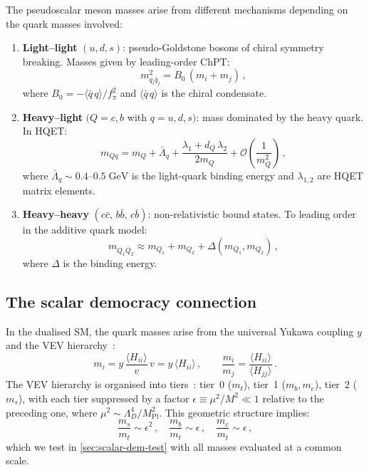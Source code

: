 \documentclass[11pt,a4paper]{article}
\newcommand{\qqbar}{\langle \bar{q}\,q \rangle}
\newcommand{\fpi}{f_\pi}
\newcommand{\Lbar}{\bar{\Lambda}}
\newcommand{\Ord}{\mathcal{O}}
\theoremstyle{plain}
\begin{document}
The pseudoscalar meson masses arise from different mechanisms depending
on the quark masses involved:
\begin{enumerate}[label=(\roman*),nosep]
  \item \textbf{Light--light} $(u,d,s)$: pseudo-Goldstone bosons of
    chiral symmetry breaking.  Masses given by leading-order ChPT:
    \begin{equation}\label{eq:chpt-mass}
      m^2_{q_i \bar{q}_j} = B_0\,(m_i + m_j)\,,
    \end{equation}
    where $B_0 = -\qqbar/\fpi^2$ and $\qqbar$ is the chiral condensate.
  \item \textbf{Heavy--light} $(Q = c,b$ with $q = u,d,s)$: mass
    dominated by the heavy quark.  In HQET:
    \begin{equation}\label{eq:hqet-mass}
      m_{Qq} = m_Q + \Lbar_q + \frac{\lambda_1 + d_Q\,\lambda_2}{2m_Q}
      + \Ord\!\left(\frac{1}{m_Q^2}\right)\,,
    \end{equation}
    where $\Lbar_q \sim 0.4$--$0.5\;\text{GeV}$ is the light-quark
    binding energy and $\lambda_{1,2}$ are HQET matrix elements.
  \item \textbf{Heavy--heavy} $(c\bar{c},\, b\bar{b},\, c\bar{b})$:
    non-relativistic bound states.  To leading order in the additive
    quark model:
    \begin{equation}\label{eq:aqm-mass}
      m_{Q_1 \bar{Q}_2} \approx m_{Q_1} + m_{Q_2} + \Delta(m_{Q_1}, m_{Q_2})\,,
    \end{equation}
    where $\Delta$ is the binding energy.
\end{enumerate}

\subsection{The scalar democracy connection}

In the dualised SM, the quark masses arise from the universal Yukawa
coupling $y$ and the VEV hierarchy~\cite{CacciapagliaSannino2024}:
\begin{equation}\label{eq:scalar-dem}
  m_i = y\,\frac{\langle H_{ii} \rangle}{v}\,v = y\,\langle H_{ii} \rangle\,,
  \qquad \frac{m_i}{m_j} = \frac{\langle H_{ii} \rangle}{\langle H_{jj} \rangle}\,.
\end{equation}
The VEV hierarchy is organised into tiers~\cite{CacciapagliaSannino2024}:
tier~0 ($m_t$), tier~1 ($m_b, m_c$), tier~2 ($m_s$), with each tier
suppressed by a factor $\epsilon \equiv \mu^2/M^2 \ll 1$ relative to
the preceding one, where $\mu^2 \sim \Lambda_D^4/M_{\text{Pl}}^2$.
This geometric structure implies:
\begin{equation}\label{eq:geometric-hierarchy}
  \frac{m_s}{m_t} \sim \epsilon^2\,,\quad
  \frac{m_b}{m_t} \sim \epsilon\,,\quad
  \frac{m_c}{m_t} \sim \epsilon\,,
\end{equation}
which we test in \cref{sec:scalar-dem-test} with all masses evaluated
at a common scale.
\end{document}
